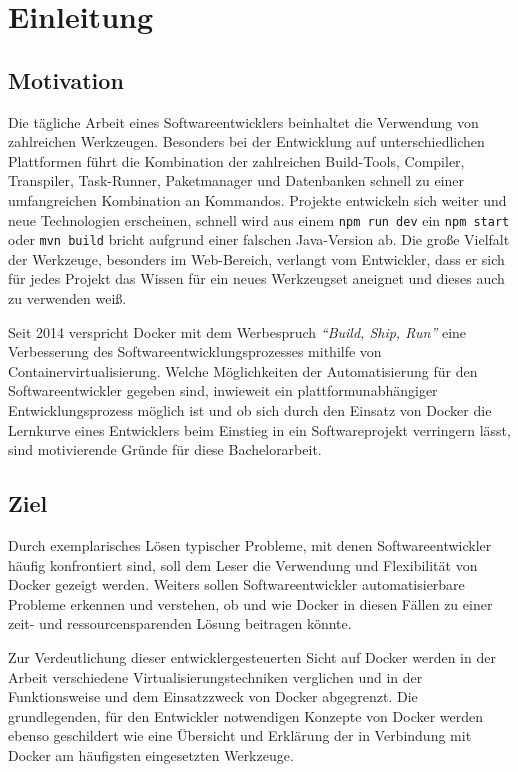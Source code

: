 \chapter{Einleitung}
\section{Motivation}
Die tägliche Arbeit eines Softwareentwicklers beinhaltet die Verwendung von zahlreichen Werkzeugen.
Besonders bei der Entwicklung auf unterschiedlichen Plattformen führt die Kombination der zahlreichen Build-Tools, Compiler, Transpiler, Task-Runner, Paketmanager und Datenbanken schnell zu einer umfangreichen Kombination an Kommandos.
Projekte entwickeln sich weiter und neue Technologien erscheinen, schnell wird aus einem \texttt{npm run dev} ein \texttt{npm start} oder \texttt{mvn build} bricht aufgrund einer falschen Java-Version ab.
Die große Vielfalt der Werkzeuge, besonders im Web-Bereich, verlangt vom Entwickler, dass er sich für jedes Projekt das Wissen für ein neues Werkzeugset aneignet und dieses auch zu verwenden weiß.

Seit 2014 verspricht Docker mit dem Werbespruch \emph{"`Build, Ship, Run"'} eine Verbesserung des Softwareentwicklungsprozesses mithilfe von Containervirtualisierung.
Welche Möglichkeiten der Automatisierung für den Softwareentwickler gegeben sind, inwieweit ein plattformunabhängiger Entwicklungsprozess möglich ist und ob sich durch den Einsatz von Docker die Lernkurve eines Entwicklers beim Einstieg in ein Softwareprojekt verringern lässt, sind motivierende Gründe für diese Bachelorarbeit.

\section{Ziel}
Durch exemplarisches Lösen typischer Probleme, mit denen Softwareentwickler häufig konfrontiert sind, soll dem Leser die Verwendung und Flexibilität von Docker gezeigt werden.
Weiters sollen Softwareentwickler automatisierbare Probleme erkennen und verstehen, ob und wie Docker in diesen Fällen zu einer zeit- und ressourcensparenden Lösung beitragen könnte.

Zur Verdeutlichung dieser entwicklergesteuerten Sicht auf Docker werden in der Arbeit verschiedene Virtualisierungstechniken verglichen und in der Funktionsweise und dem Einsatzzweck von Docker abgegrenzt.
Die grundlegenden, für den Entwickler notwendigen Konzepte von Docker werden ebenso geschildert wie eine Übersicht und Erklärung der in Verbindung mit Docker am häufigsten eingesetzten Werkzeuge.

